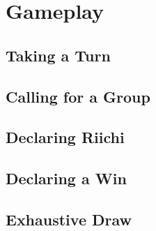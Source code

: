 \section{Gameplay}\label{core:sec:gameplay}

\subsection{Taking a Turn}\label{core:ssec:taking-a-turn}

\subsection{Calling for a Group}\label{core:ssec:calling}

\subsection{Declaring Riichi}\label{core:ssec:declaring-riichi}

\subsection{Declaring a Win}\label{core:ssec:declaring-a-win}

\subsection{Exhaustive Draw}\label{core:ssec:exhaustive-draw}
